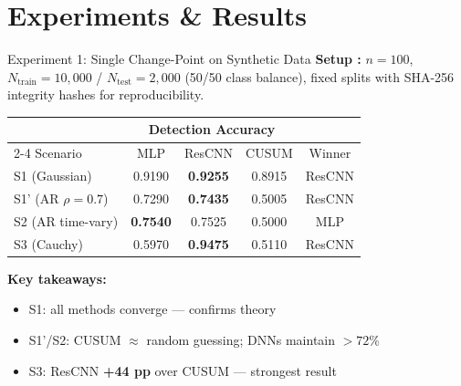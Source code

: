 \documentclass[8.5pt]{beamer}
\begin{document}
\section{Experiments \& Results}

\begin{frame}{Experiment 1: Single Change-Point on Synthetic Data}
  \textbf{Setup \cite{li2024automatic,autocpd2024}:} $n=100$,
  $N_{\text{train}}=10{,}000$ / $N_{\text{test}}=2{,}000$ (50/50 class balance),
  fixed splits with SHA-256 integrity hashes for reproducibility.

  \bigskip
  \begin{center}
  \begin{tabular}{@{}lcccc@{}}
    \toprule
    & \multicolumn{3}{c}{Detection Accuracy} & \\
    \cmidrule(lr){2-4}
    Scenario & MLP & ResCNN & CUSUM & Winner \\
    \midrule
    S1 (Gaussian)       & 0.9190 & \textbf{0.9255} & 0.8915 & ResCNN \\
    S1' (AR $\rho=0.7$) & 0.7290 & \textbf{0.7435} & 0.5005 & ResCNN \\
    S2 (AR time-vary)   & \textbf{0.7540} & 0.7525 & 0.5000 & MLP \\
    S3 (Cauchy)         & 0.5970 & \textbf{0.9475} & 0.5110 & ResCNN \\
    \bottomrule
  \end{tabular}
  \end{center}

  \bigskip
  \textbf{Key takeaways:}
  \begin{itemize}
    \item S1: all methods converge — confirms theory
    \item S1'/S2: CUSUM $\approx$ random guessing; DNNs maintain $>72\%$
    \item S3: ResCNN \textbf{+44 pp} over CUSUM — strongest result
  \end{itemize}
\end{frame}
\end{document}
